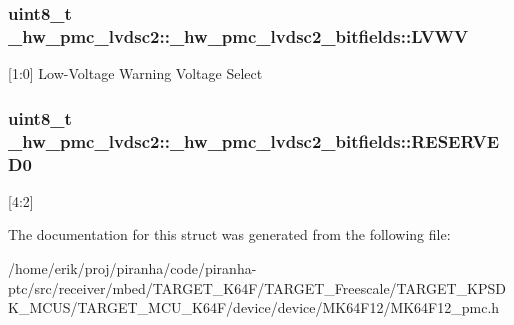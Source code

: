 \subsubsection[{\texorpdfstring{L\+V\+WV}{LVWV}}]{\setlength{\rightskip}{0pt plus 5cm}uint8\+\_\+t \+\_\+hw\+\_\+pmc\+\_\+lvdsc2\+::\+\_\+hw\+\_\+pmc\+\_\+lvdsc2\+\_\+bitfields\+::\+L\+V\+WV}\hypertarget{struct__hw__pmc__lvdsc2_1_1__hw__pmc__lvdsc2__bitfields_aba9bedb2fb2e932756fc94aa2292ff62}{}\label{struct__hw__pmc__lvdsc2_1_1__hw__pmc__lvdsc2__bitfields_aba9bedb2fb2e932756fc94aa2292ff62}
\mbox{[}1\+:0\mbox{]} Low-\/\+Voltage Warning Voltage Select 
\subsubsection[{\texorpdfstring{R\+E\+S\+E\+R\+V\+E\+D0}{RESERVED0}}]{\setlength{\rightskip}{0pt plus 5cm}uint8\+\_\+t \+\_\+hw\+\_\+pmc\+\_\+lvdsc2\+::\+\_\+hw\+\_\+pmc\+\_\+lvdsc2\+\_\+bitfields\+::\+R\+E\+S\+E\+R\+V\+E\+D0}\hypertarget{struct__hw__pmc__lvdsc2_1_1__hw__pmc__lvdsc2__bitfields_a03f14c044354f43e476f1ff63d83a966}{}\label{struct__hw__pmc__lvdsc2_1_1__hw__pmc__lvdsc2__bitfields_a03f14c044354f43e476f1ff63d83a966}
\mbox{[}4\+:2\mbox{]} 

The documentation for this struct was generated from the following file\+:\begin{DoxyCompactItemize}
\item 
/home/erik/proj/piranha/code/piranha-\/ptc/src/receiver/mbed/\+T\+A\+R\+G\+E\+T\+\_\+\+K64\+F/\+T\+A\+R\+G\+E\+T\+\_\+\+Freescale/\+T\+A\+R\+G\+E\+T\+\_\+\+K\+P\+S\+D\+K\+\_\+\+M\+C\+U\+S/\+T\+A\+R\+G\+E\+T\+\_\+\+M\+C\+U\+\_\+\+K64\+F/device/device/\+M\+K64\+F12/M\+K64\+F12\+\_\+pmc.\+h\end{DoxyCompactItemize}
